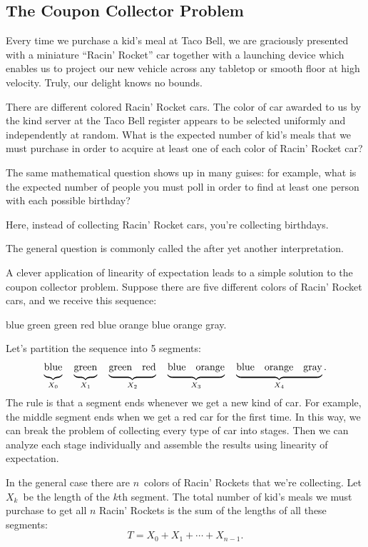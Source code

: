 \subsection{The Coupon Collector Problem}

Every time we purchase a kid's meal at Taco Bell, we are graciously
presented with a miniature ``Racin' Rocket'' car together with a
launching device which enables us to project our new vehicle across
any tabletop or smooth floor at high velocity.  Truly, our delight
knows no bounds.

There are different colored Racin' Rocket cars.  The color of car
awarded to us by the kind server at the Taco Bell register appears to
be selected uniformly and independently at random.  What is the
expected number of kid's meals that we must purchase in order to
acquire at least one of each color of Racin' Rocket car?

The same mathematical question shows up in many guises: for example,
what is the expected number of people you must poll in order to find
at least one person with each possible birthday?
\begin{editingnotes}
Here, instead of collecting Racin' Rocket cars, you're collecting
birthdays.
\end{editingnotes}
The general question is commonly called the  after yet another interpretation.

A clever application of linearity of expectation leads to a simple
solution to the coupon collector problem.  Suppose there are five
different colors of Racin' Rocket cars, and we receive this sequence:
%
\begin{center}
blue \quad green \quad green \quad red \quad blue \quad orange \quad
blue \quad orange \quad gray.
\end{center}
%
Let's partition the sequence into 5 segments:
%
\[
\underbrace{\strut\text{blue}}_{X_0} \quad
\underbrace{\strut\text{green}}_{X_1} \quad
\underbrace{\strut\text{green} \quad \text{red}}_{X_2} \quad
\underbrace{\strut\text{blue} \quad \text{orange}}_{X_3} \quad
\underbrace{\strut\text{blue} \quad \text{orange} \quad \text{gray}}_{X_4}.
\]
%
The rule is that a segment ends whenever we get a new kind of car.
For example, the middle segment ends when we get a red car for the
first time.  In this way, we can break the problem of collecting every
type of car into stages.  Then we can analyze each stage individually
and assemble the results using linearity of expectation.

In the general case there are $n$~colors of Racin' Rockets that we're
collecting.  Let $X_k$~be the length of the $k$th segment.  The total
number of kid's meals we must purchase to get all $n$ Racin' Rockets
is the sum of the lengths of all these segments:
\[
T = X_0 + X_1 + \cdots + X_{n-1}.
\]

